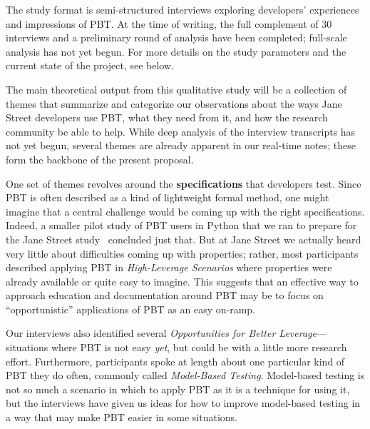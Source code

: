 The study format is semi-structured interviews exploring
developers' experiences and impressions of PBT. At the time of
writing, the full complement of 30 interviews and a preliminary round
of analysis have been completed; full-scale analysis has not yet
begun. For more details on the study parameters and the current state
of the project, see  below.  

 The main theoretical output from
this qualitative study will be a collection of themes that summarize
and categorize our observations about the ways Jane Street developers
use PBT, what they need from it, and how the research community be
able to help.  While deep analysis of the interview transcripts has
not yet begun, several themes are already apparent in our real-time
notes; these form the backbone of the present proposal.

\newcommand{\proptheme}[1]{{\color{nord-orange} \em #1}}
\newcommand{\gentheme}[1]{{\color{nord-green} \em #1}}
\newcommand{\evaltheme}[1]{{\color{nord-purple} \em #1}} One set of
themes revolves around the {\bf specifications} that developers test.
Since
PBT is often described as a kind of lightweight formal method, one
might imagine that a central challenge would be coming up with the
right specifications. Indeed, a smaller pilot study of PBT users in
Python that we ran to prepare for the Jane Street
study~\cite{PilotHypothesisStudy}\iflater{}\fi{} concluded just that. But at Jane Street
we actually heard very little about difficulties coming up with
properties; rather, most participants described applying PBT in
\proptheme{High-Leverage Scenarios} where properties were already
available or quite easy to imagine. This suggests that an effective way
to approach education and documentation around PBT may be to focus on
``opportunistic'' applications of PBT as an easy on-ramp.
%

Our interviews also identified several \proptheme{Opportunities for
  Better Leverage}---situations where PBT is not easy {\em yet}, but
could be with a little more research effort. Furthermore, participants spoke at length about one
particular kind of PBT they do often, commonly called
\proptheme{Model-Based Testing}. Model-based testing is not so much a
scenario in which to apply PBT as it is a technique for using it, but
the interviews have given us ideas for how to improve model-based
testing in a way that may make PBT easier in some situations.

